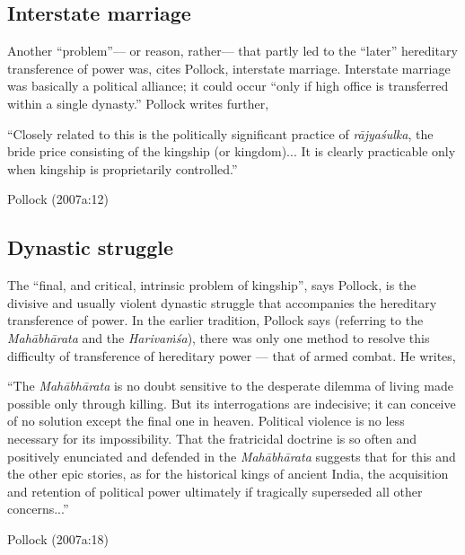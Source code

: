 \subsection{Interstate marriage}

Another “problem”--- or reason, rather--- that partly led to the “later” hereditary transference of power was, cites Pollock, interstate marriage. Interstate marriage was basically a political alliance; it could occur “only if high office is transferred within a single dynasty.” Pollock writes further, 

\begin{myquote}
“Closely related to this is the politically significant practice of {\sl rājyaśulka}, the bride price consisting of the kingship (or kingdom)... It is clearly practicable only when kingship is proprietarily controlled.”

\hfill Pollock (2007a:12)
\end{myquote}

\subsection{Dynastic struggle}\label{sec1.2.3}

The “final, and critical, intrinsic problem of kingship”, says Pollock, is the divisive and usually violent dynastic struggle that accompanies the hereditary transference of power. In the earlier tradition, Pollock says (referring to the {\sl Mahābhārata} and the {\sl Harivaṁśa}), there was only one method to resolve this difficulty of transference of hereditary power --- that of armed combat. He writes,

\begin{myquote}
“The {\sl Mahābhārata} is no doubt sensitive to the desperate dilemma of living made possible only through killing. But its interrogations are indecisive; it can conceive of no solution except the final one in heaven. Political violence is no less necessary for its impossibility. That the fratricidal doctrine is so often and positively enunciated and defended in the {\sl Mahābhārata} suggests that for this and the other epic stories, as for the historical kings of ancient India, the acquisition and retention of political power ultimately if tragically superseded all other concerns...”

\hfill Pollock (2007a:18) 
\end{myquote}

